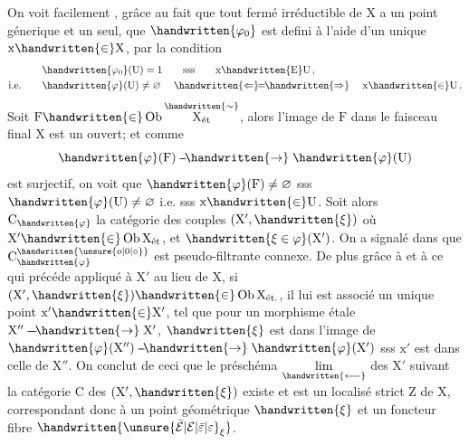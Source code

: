 \begin{lrbox}{\coteFourTypescript}
\begin{minipage}[t]{.96\linewidth}
On voit facilement , grâce au fait que tout fermé irréductible de $\mathrm X$ a un point génerique et un seul, que $\handwritten{\varphi_{0}}$ est defini à l'aide d'un  unique $\mathrm x\handwritten{\in}\mathrm X$, par la condition
\[
\begin{aligned}
&\handwritten{\varphi_{0}}(\mathrm U)=1\qquad\text{sss}\qquad \mathrm x\handwritten{\mathrm E}\mathrm U\,,\\
\text{i.e.}\qquad &\handwritten{\varphi}(\mathrm U)\ne\varnothing\quad \mathrel{\handwritten{\Leftarrow}\mkern-7mu=\mkern-7mu\handwritten{\Rightarrow}}\quad \mathrm x\handwritten{\in}\mathrm U\,.
\end{aligned}
\]
Soit $\mathrm F\handwritten{\in}\operatorname{Ob}\overset{\handwritten{\sim}}{\mathrm X_{\text{ét}}}$, alors l'image de $\mathrm F$ dans le faisceau final $\mathrm X$ est un ouvert; et comme
\[
\handwritten{\varphi}(\mathrm F)\mathrel{\mbox{-}\mkern-2mu\mbox{-}\mkern-3mu\handwritten{\to}}\handwritten{\varphi}(\mathrm U)
\]
est surjectif, on voit que $\handwritten{\varphi}(\mathrm F)\ne\varnothing$ sss $\handwritten{\varphi}(\mathrm U)\ne\varnothing$ i.e. sss $\mathrm x\handwritten{\in}\mathrm U$. Soit alors $\mathrm C_{\handwritten{\varphi}}$ la catégorie des couples $(\mathrm X',\handwritten{\xi})$ où $\mathrm X'\handwritten{\in}\operatorname{Ob}\mathrm X_{\text{ét}}$, et $\handwritten{\xi\in\varphi}(\mathrm X')$. On a signalé dans  que $\mathrm C_{\handwritten{\varphi}}^{\handwritten{\unsure{o|0|\circ}}}$ est pseudo-filtrante connexe. De plus grâce à  et à ce qui précéde appliqué à $\mathrm X'$ au lieu de $\mathrm X$, si $(\mathrm X',\handwritten{\xi})\handwritten{\in}\operatorname{Ob}\mathrm X_{\text{ét.}}$, il lui est\unsure{:} associé un unique point $\mathrm x'\handwritten{\in}\mathrm X'$, tel que pour un morphisme étale $\mathrm X''\mathrel{\mbox{-}\mkern-2mu\mbox{-}\mkern-2mu\mbox{-}\mkern-3mu\handwritten{\to}}\mathrm X'$, $\handwritten{\xi}$ est dans l'image de $\handwritten{\varphi}(\mathrm X'')\mathrel{\mbox{-}\mkern-2mu\mbox{-}\mkern-3mu\handwritten{\to}}\handwritten{\varphi}(\mathrm X')$ sss $\mathrm x'$ est dans celle de $\mathrm X''$. On conclut de ceci que le préschéma $\underset{\handwritten{\longleftarrow}}{\lim}$ des $\mathrm X'$ suivant la catégorie $\mathrm C$ des $(\mathrm X',\handwritten{\xi})$ existe et est un localisé strict $\mathrm Z$ de $\mathrm X$, correspondant donc à un point géométrique $\handwritten{\xi}$ et un foncteur fibre $\handwritten{{\unsure{\bar{\mathcal E}|\mathcal E|\bar{\varepsilon}|\varepsilon}}_{\xi}}$.
\end{minipage}
\end{lrbox}
